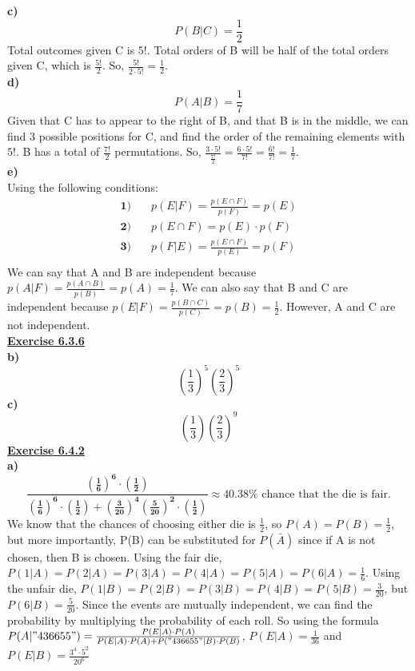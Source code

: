 \documentclass[12pt, letterpaper, twoside]{article}
\begin{document}
\break
\textbf{c)}\\
\[P(B|C) = \frac{1}{2}\]
\indent Total outcomes given C is $5!$. Total orders of B will be half of the total orders given C, which is $\frac{5!}{2}$. So, $\frac{5!}{2\cdot5!} = \frac{1}{2}$.\\
\break
\textbf{d)}\\
\[P(A|B) = \frac{1}{7}\]
\indent Given that C has to appear to the right of B, and that B is in the middle, we can find 3 possible positions for C, and find the order of the remaining elements with $5!$. B has a total of $\frac{7!}{2}$ permutations. So, $\frac{3\cdot5!}{\frac{7!}{2}} = \frac{6\cdot5!}{7!} = \frac{6!}{7!} = \frac{1}{7}$.\\
\break
\newpage\noindent
\textbf{e)}\\
Using the following conditions:
\begin{align*}
\mathbf{1)}& \quad p(E|F) = \frac{p(E\cap F)}{p(F)} = p(E)\\
\mathbf{2)}& \quad p(E \cap F) = p(E) \cdot p(F) \\
\mathbf{3)}& \quad p(F|E) = \frac{p(E \cap F)}{p(E)} = p(F)\\
\end{align*}
\indent We can say that A and B are independent because $p(A|F) = \frac{p(A\cap B)}{p(B)} = p(A) = \frac{1}{7}$. We can also say that B and C are independent because $p(E|F) = \frac{p(B\cap C)}{p(C)} = p(B) = \frac{1}{2}$. However, A and C are not independent.\\
\break
\textbf{\underline{Exercise 6.3.6}}\\
\break
\textbf{b)}\\
\[\left( \frac{1}{3}\right)^5 \left(\frac{2}{3}\right) ^5\]
\break
\textbf{c)}\\
\[\left( \frac{1}{3}\right) \left(\frac{2}{3}\right) ^9\]
\break
\textbf{\underline{Exercise 6.4.2}}\\
\break
\textbf{a)}\\
\[\mathbf{\frac{(\frac{1}{6})^6\cdot (\frac{1}{2})}{(\frac{1}{6})^6\cdot (\frac{1}{2}) + (\frac{3}{20})^4 (\frac{5}{20})^2\cdot (\frac{1}{2})}} \approx 40.38\% \text{ chance that the die is fair.}\]
\indent We know that the chances of choosing either die is $\frac{1}{2}$, so $P(A) = P(B) = \frac{1}{2}$, but more importantly, P(B) can be substituted for $P(\bar{A})$ since if A is not chosen, then B is chosen. Using the fair die, $P(1|A) = P(2|A) = P(3|A) = P(4|A) = P(5|A) = P(6|A) = \frac{1}{6}$. Using the unfair die, $P(1|B) = P(2|B) = P(3|B) = P(4|B) = P(5|B) = \frac{3}{20}$, but $P(6|B) = \frac{5}{20}$. Since the events are mutually independent, we can find the probability by multiplying the probability of each roll. So using the formula $P(A|"436655") = \frac{P(E|A) \cdot P(A)}{P(E|A) \cdot P(A) + P("436655"|B) \cdot P(B)}$, $P(E|A) = \frac{1}{36}$ and $P(E|B) = \frac{3^4\cdot 5^2}{20^6}$
\end{document}
